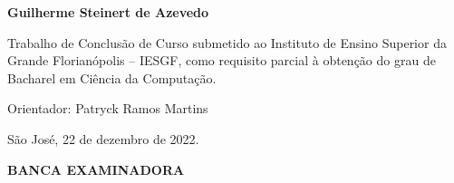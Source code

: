\begin{center}
    \textbf{Guilherme Steinert de Azevedo}

    \vspace*{1.5cm}

    \textbf{\seniorThesisTitle}

    \vspace*{1cm}

    \begin{sidecite}
        Trabalho de Conclusão de Curso submetido ao Instituto de
        Ensino Superior da Grande Florianópolis – IESGF, como
        requisito parcial à obtenção do grau de Bacharel em Ciência
        da Computação.

        Orientador: Patryck Ramos Martins

        \vspace{\onelineskip}
        São José, 22 de dezembro de 2022.

    \end{sidecite}

    \vspace*{1cm}

    \textbf{\uppercase{Banca examinadora}}


    \vfill

\end{center}
\newpage



















